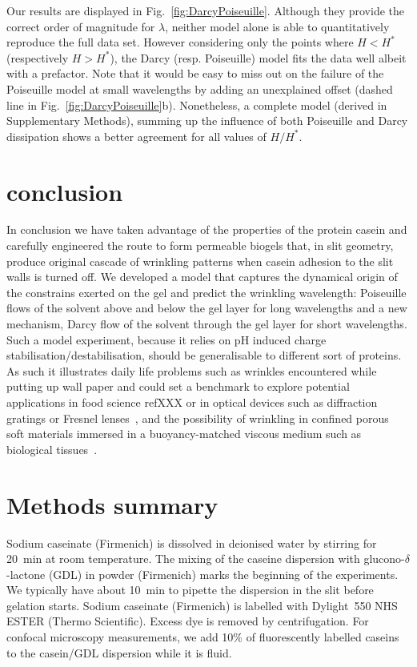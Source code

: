 \documentclass[twocolumn,superscriptaddress,showpacs,preprintnumbers,
amsmath,amssymb,prl]{revtex4-1}
\begin{document}
Our results are displayed in Fig.~\ref{fig:DarcyPoiseuille}. Although they provide the correct order of magnitude for $\lambda$, neither model alone is able to quantitatively reproduce the full data set. However considering only the points where $H<H^*$ (respectively $H>H^*$), the Darcy (resp. Poiseuille) model fits the data well albeit with a prefactor. Note that it would be easy to miss out on the failure of the Poiseuille model at small wavelengths by adding an unexplained offset (dashed line in Fig.~\ref{fig:DarcyPoiseuille}b). Nonetheless, a complete model (derived in Supplementary Methods), summing up the influence of both Poiseuille and Darcy dissipation shows a better agreement for all values of $H/H^*$.

\section*{conclusion}

In conclusion we have taken advantage of the properties of the protein casein and carefully engineered the route to form permeable biogels that, in slit geometry, produce original cascade of wrinkling patterns when casein adhesion to the slit walls is turned off. We developed a model that captures the dynamical origin of the constrains exerted on the gel and predict the wrinkling wavelength: Poiseuille flows of the solvent above and below the gel layer for long wavelengths and a new mechanism, Darcy flow of the solvent through the gel layer for short wavelengths. Such a model experiment, because it relies on pH induced charge stabilisation/destabilisation, should be generalisable to different sort of proteins. As such it illustrates daily life problems such as wrinkles encountered while putting up wall paper and could set a benchmark to explore potential applications in food science refXXX or in optical devices such as diffraction gratings or Fresnel lenses~\cite{Li2013}, and the possibility of wrinkling in confined porous soft materials immersed in a buoyancy-matched viscous medium such as biological tissues~\cite{Ma2004,Longley2013}.



\section*{Methods summary}

Sodium caseinate (Firmenich) is dissolved in deionised water by stirring for \SI{20}{\minute} at room temperature. The mixing of the caseine dispersion with glucono-$\delta$-lactone (GDL) in powder (Firmenich) marks the beginning of the experiments. We typically have about \SI{10}{\minute} to pipette the dispersion in the slit before gelation starts. Sodium caseinate (Firmenich) is labelled with Dylight~550 NHS ESTER (Thermo Scientific). Excess dye is removed by centrifugation. For confocal microscopy measurements, we add 10\% of fluorescently labelled caseins to the casein/GDL dispersion while it is fluid.
\end{document}
